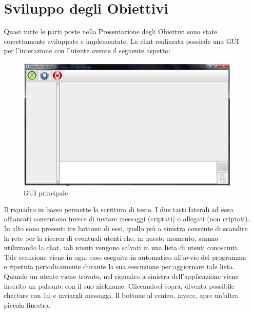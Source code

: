 \section{Sviluppo degli Obiettivi}
Quasi tutte le parti poste nella Presentazione degli Obiettivi sono state correttamente
sviluppate e implementate. La chat realizzata possiede una GUI per l'interazione
con l'utente avente il seguente aspetto:
\begin{figure}[h]
\centering
\includegraphics[scale=0.4]{gui1.jpg}
\caption{GUI principale\label{fig:gui}}
\end{figure}

Il riquadro in basso permette la scrittura di testo.
I due tasti laterali ad esso affiancati
consentono invece di inviare messaggi (criptati) o allegati (non criptati).
In alto sono presenti tre bottoni:
di essi, quello più a sinistra consente di scandire la rete per la ricerca di eventuali 
utenti che, in questo momento, stanno utilizzando la chat, tali utenti vengono salvati
in una lista di utenti conosciuti.
Tale scansione viene in ogni caso eseguita in automatico all'avvio del programma
e ripetuta periodicamente durante la sua esecuzione per aggiornare tale lista.
Quando un utente viene trovato, nel riquadro a sinistra 
dell'applicazione viene inserito un pulsante con il suo nickname.
Cliccandoci sopra, diventa possibile chattare con lui e inviargli messaggi.
Il bottone al centro, invece, apre un'altra piccola finestra.

